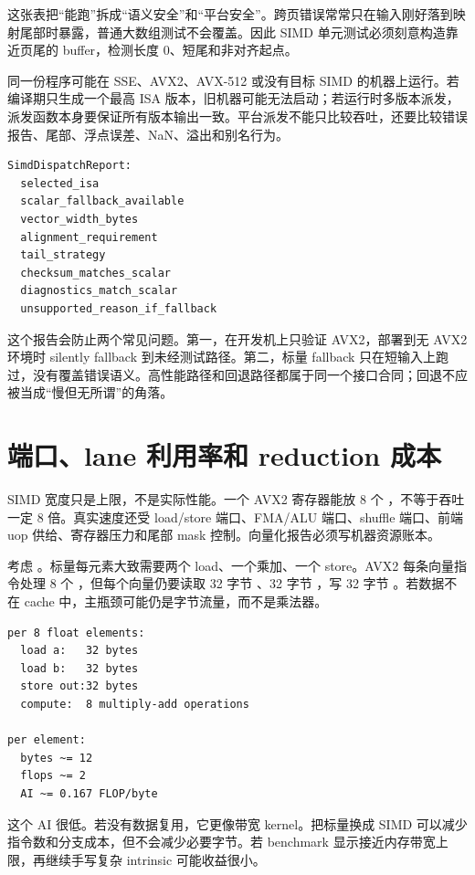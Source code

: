 这张表把“能跑”拆成“语义安全”和“平台安全”。跨页错误常常只在输入刚好落到映射尾部时暴露，普通大数组测试不会覆盖。因此 SIMD 单元测试必须刻意构造靠近页尾的 buffer，检测长度 0、短尾和非对齐起点。

同一份程序可能在 SSE、AVX2、AVX-512 或没有目标 SIMD 的机器上运行。若编译期只生成一个最高 ISA 版本，旧机器可能无法启动；若运行时多版本派发，派发函数本身要保证所有版本输出一致。平台派发不能只比较吞吐，还要比较错误报告、尾部、浮点误差、NaN、溢出和别名行为。

\begin{lstlisting}[numbers=none,caption={SIMD 多版本派发的报告字段}]
SimdDispatchReport:
  selected_isa
  scalar_fallback_available
  vector_width_bytes
  alignment_requirement
  tail_strategy
  checksum_matches_scalar
  diagnostics_match_scalar
  unsupported_reason_if_fallback
\end{lstlisting}

这个报告会防止两个常见问题。第一，在开发机上只验证 AVX2，部署到无 AVX2 环境时 silently fallback 到未经测试路径。第二，标量 fallback 只在短输入上跑过，没有覆盖错误语义。高性能路径和回退路径都属于同一个接口合同；回退不应被当成“慢但无所谓”的角落。

\section{端口、lane 利用率和 reduction 成本}

SIMD 宽度只是上限，不是实际性能。一个 AVX2 寄存器能放 8 个 ，不等于吞吐一定 8 倍。真实速度还受 load/store 端口、FMA/ALU 端口、shuffle 端口、前端 uop 供给、寄存器压力和尾部 mask 控制。向量化报告必须写机器资源账本。

考虑 。标量每元素大致需要两个 load、一个乘加、一个 store。AVX2 每条向量指令处理 8 个 ，但每个向量仍要读取 32 字节 、32 字节 ，写 32 字节 。若数据不在 cache 中，主瓶颈可能仍是字节流量，而不是乘法器。

\begin{lstlisting}[numbers=none,caption={一对一 float 变换的向量账本}]
per 8 float elements:
  load a:   32 bytes
  load b:   32 bytes
  store out:32 bytes
  compute:  8 multiply-add operations

per element:
  bytes ~= 12
  flops ~= 2
  AI ~= 0.167 FLOP/byte
\end{lstlisting}

这个 AI 很低。若没有数据复用，它更像带宽 kernel。把标量换成 SIMD 可以减少指令数和分支成本，但不会减少必要字节。若 benchmark 显示接近内存带宽上限，再继续手写复杂 intrinsic 可能收益很小。

